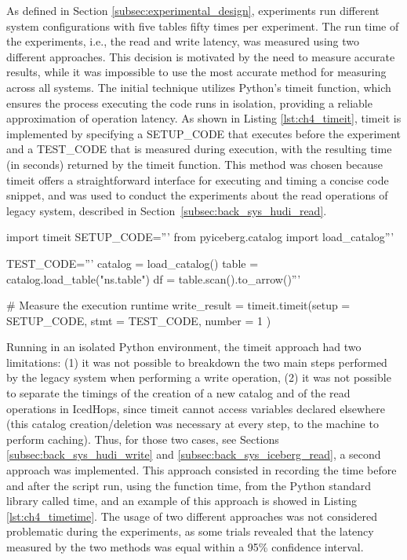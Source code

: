 As defined in Section \ref{subsec:experimental_design}, experiments run different system configurations with five tables fifty times per experiment.
The run time of the experiments, i.e., the read and write latency, was measured using two different approaches. This decision is motivated by the need to measure accurate results, while it was impossible to use the most accurate method for measuring across all systems. The initial technique utilizes Python's timeit function, which ensures the process executing the code runs in isolation, providing a reliable approximation of operation latency. As shown in Listing \ref{lst:ch4_timeit}, timeit is implemented by specifying a SETUP\_CODE that executes before the experiment and a TEST\_CODE that is measured during execution, with the resulting time (in seconds) returned by the timeit function. This method was chosen because timeit offers a straightforward interface for executing and timing a concise code snippet, and was used to conduct the experiments about the read operations of legacy system, described in Section~\ref{subsec:back_sys_hudi_read}.

\begin{minipage}{\textwidth}
    \begin{python}[caption={[Measuring latency using Timeit] Timeit usage to measure the time to read from an Iceberg table stored on \gls{HopsFS}.}, label={lst:ch4_timeit}, basicstyle=\small]
    import timeit
    SETUP_CODE='''
    from pyiceberg.catalog import load_catalog'''
        
    TEST_CODE='''
    catalog = load_catalog()
    table   = catalog.load_table("ns.table")
    df      = table.scan().to_arrow()'''
    
    # Measure the execution runtime
    write_result = timeit.timeit(setup  = SETUP_CODE,
                                 stmt   = TEST_CODE,
                                 number = 1          )
    \end{python}
\end{minipage}
\medskip

Running in an isolated Python environment, the timeit approach had two limitations: (1) it was not possible to breakdown the two main steps performed by the legacy system when performing a write operation, (2) it was not possible to separate the timings of the creation of a new catalog and of the read operations in IcedHops, since timeit cannot access variables declared elsewhere (this catalog creation/deletion was necessary at every step, to the machine to perform caching). Thus, for those two cases, see Sections \ref{subsec:back_sys_hudi_write} and \ref{subsec:back_sys_iceberg_read}, a second approach was implemented. This approach consisted in recording the time before and after the script run, using the function time, from the Python standard library called time, and an example of this approach is showed in Listing \ref{lst:ch4_timetime}. The usage of two different approaches was not considered problematic during the experiments, as some trials revealed that the latency measured by the two methods was equal within a 95\% confidence interval.

